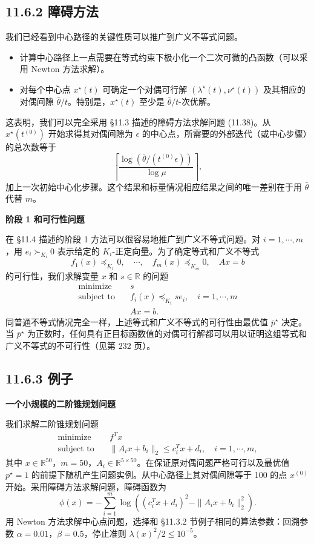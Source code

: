 \documentclass[UTF8,12pt,a4paper,fontset=fandol]{ctexart}
\begin{document}
\subsection*{11.6.2 障碍方法}

我们已经看到中心路径的关键性质可以推广到广义不等式问题。
\begin{itemize}
\item 计算中心路径上一点需要在等式约束下极小化一个二次可微的凸函数（可以采用 Newton 方法求解）。
\item 对每个中心点 $x^\star(t)$ 可确定一个对偶可行解 $(\lambda^\star(t),\nu^\star(t))$ 及其相应的对偶间隙 $\bar{\theta}/t$。特别是，$x^\star(t)$ 至少是 $\bar{\theta}/t$-次优解。
\end{itemize}
这表明，我们可以完全采用 \S 11.3 描述的障碍方法求解问题 (11.38)。从 $x^\star(t^{(0)})$ 开始求得其对偶间隙为 $\epsilon$ 的中心点，所需要的外部迭代（或中心步骤）的总次数等于
\[
\left\lceil\frac{\log(\bar{\theta}/(t^{(0)}\epsilon))}{\log\mu}\right\rceil,
\]
加上一次初始中心化步骤。这个结果和标量情况相应结果之间的唯一差别在于用 $\bar{\theta}$ 代替 $m$。

\noindent\textbf{阶段 1 和可行性问题}

在 \S 11.4 描述的阶段 1 方法可以很容易地推广到广义不等式问题。对 $i=1,\cdots,m$，用 $e_i\succ_{K_i}0$ 表示给定的 $K_i$-正定向量。为了确定等式和广义不等式
\[
f_1(x)\preceq_{K_1}0,\quad \cdots,\quad f_m(x)\preceq_{K_m}0,\quad Ax=b
\]
的可行性，我们求解变量 $x$ 和 $s\in\mathbb{R}$ 的问题
\[
\begin{aligned}
\text{minimize}\quad & s\\
\text{subject to}\quad & f_i(x)\preceq_{K_i}se_i,\quad i=1,\cdots,m\\
& Ax=b.
\end{aligned}
\]
同普通不等式情况完全一样，上述等式和广义不等式的可行性由最优值 $\bar{p}^\star$ 决定。当 $\bar{p}^\star$ 为正数时，任何具有正目标函数值的对偶可行解都可以用以证明这组等式和广义不等式的不可行性（见第 232 页）。

\subsection*{11.6.3 例子}

\noindent\textbf{一个小规模的二阶锥规划问题}

我们求解二阶锥规划问题
\[
\begin{aligned}
\text{minimize}\quad & f^Tx\\
\text{subject to}\quad & \|A_ix+b_i\|_2\leq c_i^Tx+d_i,\quad i=1,\cdots,m,
\end{aligned}
\]
其中 $x\in\mathbb{R}^{50}$，$m=50$，$A_i\in\mathbb{R}^{5\times 50}$。在保证原对偶问题严格可行以及最优值 $p^\star=1$ 的前提下随机产生问题实例。从中心路径上其对偶间隙等于 100 的点 $x^{(0)}$ 开始。采用障碍方法求解问题，障碍函数为
\[
\phi(x)=-\sum_{i=1}^m\log\left((c_i^Tx+d_i)^2-\|A_ix+b_i\|_2^2\right).
\]
用 Newton 方法求解中心点问题，选择和 \S 11.3.2 节例子相同的算法参数：回溯参数 $\alpha=0.01$，$\beta=0.5$，停止准则 $\lambda(x)^2/2\leq 10^{-5}$。
\end{document}
